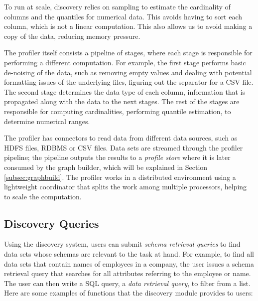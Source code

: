 
To run at scale, discovery relies on sampling to estimate the cardinality of
columns and the quantiles for numerical data. This avoids having to sort each
column, which is not a linear computation.  This also allows us to avoid making a copy of
the data,  reducing memory pressure.

The profiler itself consists a pipeline of stages, where each stage is
responsible for performing a different computation. For example, the first stage
performs basic de-noising of the data, such as removing empty values and dealing
with potential formatting issues of the underlying files, \eg figuring out the
separator for a CSV file.  The second stage determines the data type of each column,
information that is propagated along with the data to the next stages. The rest
of the stages are responsible for computing cardinalities, performing quantile
estimation, \eg to determine numerical ranges.

The profiler has connectors to read data from different data sources, such as
HDFS files, RDBMS or CSV files. Data sets are streamed through the profiler
pipeline;  the pipeline outputs the results
to a {\it profile store} where it is later consumed by the graph builder, which will be
explained in Section \ref{subsec:graphbuild}.
The profiler works in a distributed environment using a lightweight coordinator
that splits the work among multiple processors, helping to scale the
computation.



\subsection{Discovery Queries}
\label{subsec:api}

Using the discovery system, users can submit \emph{schema retrieval queries}
to find  data sets whose schemas are relevant to the task at hand. 
For example, to find all data sets that contain names of
employees in a company, the user issues a schema retrieval query that searches for all
attributes referring to the employee or name.
The user can then write a SQL query, \ie a \emph{data retrieval query}, to filter from a list. 
Here are some examples of functions that the discovery module provides to users:

